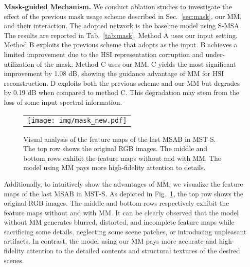 \documentclass[10pt,twocolumn,letterpaper]{article}
\begin{document}
\noindent\textbf{Mask-guided Mechanism.} We conduct ablation studies to investigate the effect of the previous mask usage scheme described in Sec.~\ref{sec:mask}, our MM, and their interaction. The adopted network is the baseline model using S-MSA. The results are reported in Tab.~\ref{tab:mask}.  Method A uses our input setting. Method B exploits the previous scheme that adopts  as the input. B achieves a limited improvement due to the HSI representation corruption and under-utilization of the mask. Method C uses our MM. C yields the most significant improvement by 1.08 dB, showing the guidance advantage of MM for HSI reconstruction. D exploits both the previous scheme and our MM but degrades by 0.19 dB when compared to method C. This degradation may stem from the loss of some input spectral information.

\begin{figure}[h]
	\begin{center}
		\begin{tabular}[t]{c} \hspace{-2.5mm} 
			\texttt{[image: img/mask\_new.pdf]}
		\end{tabular}
	\end{center}
	\vspace{-6mm}
	\caption{\small  Visual analysis of the feature maps of the last MSAB in MST-S. The top row shows the original RGB images. The middle and bottom rows exhibit the feature maps without and with MM. The model using MM pays more high-fidelity attention to details.}
	\label{fig:fea}
	\vspace{-5mm}
\end{figure}

Additionally, to intuitively show the advantages of MM, we visualize the feature maps of the last MSAB in MST-S. As depicted in Fig.~\ref{fig:fea}, the top row shows the original RGB images. The middle and bottom rows respectively exhibit the feature maps without and with MM. It can be clearly observed that the model without MM generates blurred, distorted, and incomplete feature maps while sacrificing some details, neglecting some scene patches, or introducing unpleasant artifacts. In contrast, the model using our MM pays more accurate and high-fidelity attention to the detailed contents and structural textures of the desired scenes.




\vspace{-3mm}
\end{document}
